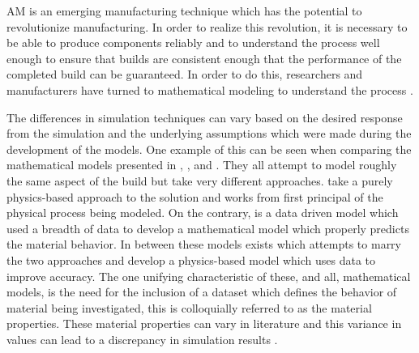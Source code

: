 \label{introAMsim}

\Acf{AM} is an emerging manufacturing technique which has the potential to revolutionize manufacturing.  In order to realize this revolution, it is necessary to be able to produce components reliably and to understand the process well enough to ensure that builds are consistent enough that the performance of the completed build can be guaranteed.  In order to do this, researchers and manufacturers have turned to mathematical modeling to understand the process \cite{wangClosedLoopHighFidelitySimulation2021}.  

The differences in simulation techniques can vary based on the desired response from the simulation and the underlying assumptions which were made during the development of the models.
One example of this can be seen when comparing the mathematical models presented in \cite{wangClosedLoopHighFidelitySimulation2021}, \cite{royDatadrivenModelingThermal2020}, and \cite{mogesHYBRIDMODELINGAPPROACH2020}.  They all attempt to model roughly the same aspect of the build but take very different approaches.
\cite{wangClosedLoopHighFidelitySimulation2021} take a purely physics-based approach to the solution and works from first principal of the physical process being modeled.
On the contrary, \cite{royDatadrivenModelingThermal2020} is a data driven model which used a breadth of data to develop a mathematical model which properly predicts the material behavior. 
In between these models exists \cite{mogesHYBRIDMODELINGAPPROACH2020} which attempts to marry the two approaches and develop a physics-based model which uses data to improve accuracy.
The one unifying characteristic of these, and all, mathematical models, is the need for the inclusion of a dataset which defines the behavior of material being investigated, this is colloquially referred to as the material properties.  These material properties can vary in literature and this variance in values can lead to a discrepancy in simulation results \cite{Daryabeigi2011}.

